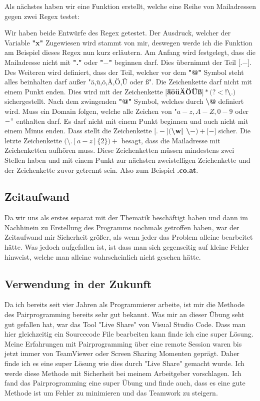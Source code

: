 \documentclass[12pt]{article}
\begin{document}
Als nächstes haben wir eine Funktion erstellt, welche eine Reihe von Mailadressen gegen zwei Regex testet:

Wir haben beide Entwürfe des Regex getestet. Der Ausdruck, welcher der Variable \textbf{"x"} Zugewiesen wird stammt von mir, deswegen werde ich die Funktion am Beispiel dieses Regex nun kurz erläutern. Am Anfang wird festgelegt, dass die Mailadresse nicht mit \textbf{"."} oder \textbf{"$-$"} beginnen darf. Dies übernimmt der Teil \textbf{\^{$[$}\^{$.-]$}}. Des Weiteren wird definiert, dass der Teil, welcher vor dem \textbf{"@"} Symbol steht alles beinhalten darf außer "ä,ü,ö,Ä,Ö,Ü oder {\ss}". Die Zeichenkette darf nicht mit einem Punkt enden. Dies wird mit der Zeichenkette \textbf{$[$\^{äöüÄÖÜ{\ss}$]*(?<!$\textbackslash$.)$}} sichergestellt. Nach dem zwingenden \textbf{"@"} Symbol, welches durch \textbf{\textbackslash @} definiert wird. Muss ein Domain folgen, welche alle Zeichen von "$a-z,A-Z,0-9$ oder $-"$ enthalten darf. Es darf nicht mit einem Punkt beginnen und auch nicht mit einem Minus enden. Dass stellt die Zeichenkette \textbf{$[$\^{$.-$}$]($\textbackslash w| \textbackslash$-)+[$\^{$-$}$]$} sicher. Die letzte Zeichenkette $($\textbackslash$.[a-z]\{2\})+$ besagt, dass die Mailadresse mit Zeichenketten aufhören muss. Diese Zeichenketten müssen mindestens zwei Stellen haben und mit einem Punkt zur nächsten zweistelligen Zeichenkette und der Zeichenkette zuvor getrennt sein. Also zum Beispiel \textbf{.co.at}.
\subsection{Zeitaufwand}
Da wir uns als erstes separat mit der Thematik beschäftigt haben und dann im Nachhinein zu Erstellung des Programms nochmals getroffen haben, war der Zeitaufwand mir Sicherheit größer, als wenn jeder das Problem alleine bearbeitet hätte. Was jedoch aufgefallen ist, ist dass man sich gegenseitig auf kleine Fehler hinweist, welche man alleine wahrscheinlich nicht gesehen hätte.
\subsection{Verwendung in der Zukunft}
Da ich bereits seit vier Jahren als Programmierer arbeite, ist mir die Methode des Pairprogramming bereits sehr gut bekannt. Was mir an dieser Übung seht gut gefallen hat, war das Tool "Live Share" von Visual Studio Code. Dass man hier gleichzeitig ein Sourcecode File bearbeiten kann finde ich eine super Lösung. Meine Erfahrungen mit Pairprogramming über eine remote Session waren bis jetzt immer von TeamViewer oder Screen Sharing Momenten geprägt. Daher finde ich es eine super Lösung wie dies durch "Live Share" gemacht wurde. Ich werde diese Methode mit Sicherheit bei meinem Arbeitgeber vorschlagen. Ich fand das Pairprogramming eine super Übung und finde auch, dass es eine gute Methode ist um Fehler zu minimieren und das Teamwork zu steigern.
\end{document}
